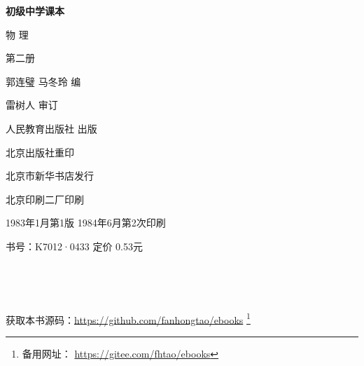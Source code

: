 \begin{titlepage}
    \begin{center}
        \vspace*{3cm}

        {\Large \textbf{初级中学课本} }

        \vspace{1cm}

        {\Huge 物 \qquad 理}

        \vspace{1.5cm}

        {\Large 第二册}


        \vspace{1cm}
        {\Large 郭连璧 \qquad 马冬玲 \quad 编}

        \vspace{0.5cm}
        {\Large 雷树人 \quad 审订}

        \vfill

        人民教育出版社 出版

        北京出版社重印

        北京市新华书店发行

        北京印刷二厂印刷

        1983年1月第1版  \qquad 1984年6月第2次印刷

        书号：K7012·0433 \quad 定价 0.53元

        \,

        \,

        获取本书源码：\url{https://github.com/fanhongtao/ebooks} \footnote{备用网址： \url{https://gitee.com/fhtao/ebooks} }
    \end{center}
 \end{titlepage}
